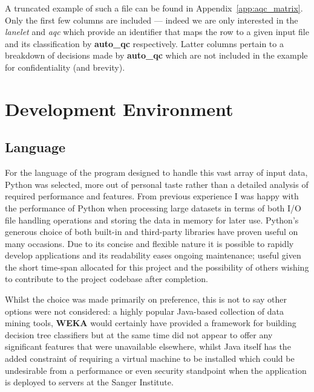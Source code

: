 A truncated example of such a file can be found in Appendix~\ref{app:aqc_matrix}.
Only the first few columns are included --- indeed we are only interested in the
\textit{lanelet} and \textit{aqc} which provide an identifier that maps the row
to a given input file and its classification by \textbf{auto\_qc} respectively.
Latter columns pertain to a breakdown of decisions made by \textbf{auto\_qc}
which are not included in the example for confidentiality (and brevity).


\section{Development Environment}
\subsection{Language}
For the language of the program designed to handle this vast array of input
data, Python was selected, more out of personal taste rather than a
detailed analysis of required performance and features. From previous experience
I was happy with the performance of Python when processing large datasets in
terms of both I/O file handling operations and storing the data in memory for
later use. Python's generous choice of both built-in and third-party libraries
have proven useful on many occasions. Due to its concise and flexible nature it
is possible to rapidly develop applications and its readability eases ongoing
maintenance; useful given the short time-span allocated for this project and the
possibility of others wishing to contribute to the project codebase after
completion.

Whilst the choice was made primarily on preference, this is not to say other
options were not considered: a highly popular Java-based collection of data
mining tools, \textbf{WEKA}\citep{weka} would certainly have provided a
framework for building decision tree classifiers but at the same time did not
appear to offer any significant features that were unavailable elsewhere, whilst
Java itself has the added constraint of requiring a virtual machine to be
installed which could be undesirable from a performance or even security
standpoint when the application is deployed to servers at the Sanger Institute.


